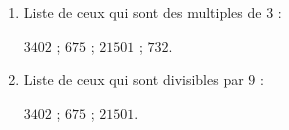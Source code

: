     \begin{enumerate}
        \item Liste de ceux qui sont des multiples de $3$ :

        $\num{3 402}$ ; $\num{675}$ ; $\num{21 501}$ ; $\num{732}$.
        \item Liste de ceux qui sont divisibles par $9$ :

        $\num{3 402}$ ; $\num{675}$ ; $\num{21 501}$.
    \end{enumerate}
